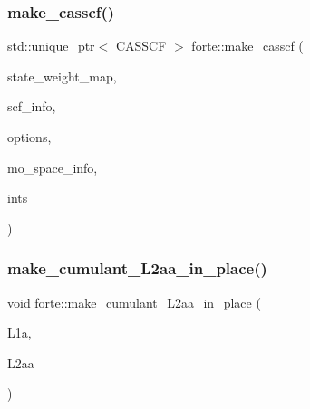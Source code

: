 \mbox{\label{namespaceforte_a27677588491df4371b344d522fefca0a}} 
\subsubsection{\texorpdfstring{make\+\_\+casscf()}{make\_casscf()}}
{\footnotesize\ttfamily std\+::unique\+\_\+ptr$<$ \mbox{\hyperlink{classforte_1_1_c_a_s_s_c_f}{C\+A\+S\+S\+CF}} $>$ forte\+::make\+\_\+casscf (\begin{DoxyParamCaption}\item[{const std\+::map$<$ \mbox{\hyperlink{classforte_1_1_state_info}{State\+Info}}, std\+::vector$<$ double $>$$>$ \&}]{state\+\_\+weight\+\_\+map,  }\item[{std\+::shared\+\_\+ptr$<$ \mbox{\hyperlink{classforte_1_1_s_c_f_info}{S\+C\+F\+Info}} $>$}]{scf\+\_\+info,  }\item[{std\+::shared\+\_\+ptr$<$ \mbox{\hyperlink{classforte_1_1_forte_options}{Forte\+Options}} $>$}]{options,  }\item[{std\+::shared\+\_\+ptr$<$ \mbox{\hyperlink{classforte_1_1_m_o_space_info}{M\+O\+Space\+Info}} $>$}]{mo\+\_\+space\+\_\+info,  }\item[{std\+::shared\+\_\+ptr$<$ \mbox{\hyperlink{classforte_1_1_forte_integrals}{Forte\+Integrals}} $>$}]{ints }\end{DoxyParamCaption})}

\mbox{\label{namespaceforte_aabd2ba38057938d7d8697982bca86f96}} 
\subsubsection{\texorpdfstring{make\+\_\+cumulant\+\_\+\+L2aa\+\_\+in\+\_\+place()}{make\_cumulant\_L2aa\_in\_place()}}
{\footnotesize\ttfamily void forte\+::make\+\_\+cumulant\+\_\+\+L2aa\+\_\+in\+\_\+place (\begin{DoxyParamCaption}\item[{const ambit\+::\+Tensor \&}]{L1a,  }\item[{ambit\+::\+Tensor \&}]{L2aa }\end{DoxyParamCaption})}



